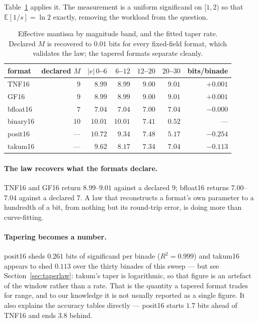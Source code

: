 \documentclass[11pt]{article}
\theoremstyle{definition}
\begin{document}
Table~\ref{tab:meff} applies it. The measurement is a uniform significand on
$[1,2)$ so that $\mathbb{E}[1/s] = \ln 2$ exactly, removing the workload from the
question.

\begin{table}[t]\centering
\caption{Effective mantissa by magnitude band, and the fitted taper rate. Declared
$M$ is recovered to $0.01$ bits for every fixed-field format, which validates the
law; the tapered formats separate cleanly.}
\label{tab:meff}
\begin{tabular}{lrrrrrr}
\toprule
format & declared $M$ & $|e|\,0$--$6$ & $6$--$12$ & $12$--$20$ & $20$--$30$ & bits/binade \\
\midrule
TNF16   & $9$  & $8.99$  & $8.99$ & $9.00$ & $9.01$ & $+0.001$ \\
GF16     & $9$  & $8.99$  & $8.99$ & $9.00$ & $9.01$ & $+0.001$ \\
bfloat16 & $7$  & $7.04$  & $7.04$ & $7.00$ & $7.04$ & $-0.000$ \\
binary16 & $10$ & $10.01$ & $10.01$ & $7.41$ & $0.52$ & --- \\
posit16  & ---  & $10.72$ & $9.34$ & $7.48$ & $5.17$ & $\mathbf{-0.254}$ \\
takum16  & ---  & $9.62$  & $8.17$ & $7.34$ & $7.04$ & $\mathbf{-0.113}$ \\
\bottomrule
\end{tabular}
\end{table}

\paragraph{The law recovers what the formats declare.} TNF16 and GF16 return
$8.99$--$9.01$ against a declared 9; bfloat16 returns $7.00$--$7.04$ against a
declared 7. A law that reconstructs a format's own parameter to a hundredth of a
bit, from nothing but its round-trip error, is doing more than curve-fitting.

\paragraph{Tapering becomes a number.} posit16 sheds $0.261$ bits of significand
per binade ($R^2 = 0.999$) and takum16 appears to shed $0.113$ over the thirty
binades of this sweep --- but see Section~\ref{sec:taperlaw}: takum's taper is
logarithmic, so that figure is an artefact of the window rather than a rate. That is the
quantity a tapered format trades for range, and to our knowledge it is not usually
reported as a single figure. It also explains the accuracy tables directly ---
posit16 starts $1.7$ bits ahead of TNF16 and ends $3.8$ behind.
\end{document}
